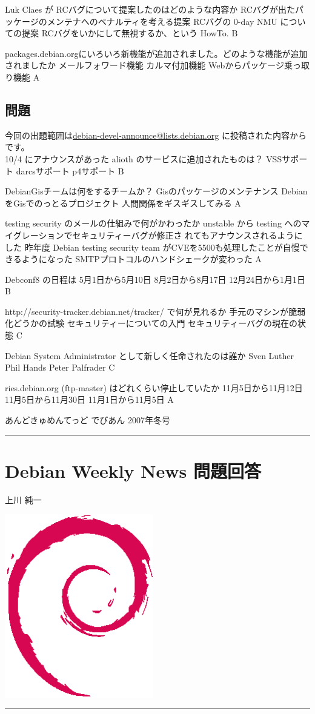 \documentclass[mingoth,a4paper]{jsarticle}
\renewcommand{\dancersection}[2]{%
\newpage
あんどきゅめんてっど でびあん 2007年冬号
%
\vspace{0.1mm}\\
{\color{dancerlightblue}\rule{\hsize}{2mm}}

%
%
\begin{minipage}[t]{0.7\hsize}
\color{dancerdarkblue}
\vspace{1cm}
\section{#1}
\hfill{}#2\\
\end{minipage}
\begin{minipage}[t]{0.3\hsize}
\vspace{-2cm}
\hfill{}\includegraphics[height=8cm]{image200502/openlogo-nd.eps}\\
\vspace{-5cm}
\end{minipage}
%
%
{\color{dancerdarkblue}\rule{0.74\hsize}{2mm}}
%
\vspace{2cm}
}
\begin{document}
\santaku
{Luk Claes が RCバグについて提案したのはどのような内容か}
{RCバグが出たパッケージのメンテナへのペナルティを考える提案}
{RCバグの 0-day NMU についての提案}
{RCバグをいかにして無視するか、という HowTo.}
{B}

\santaku
{packages.debian.orgにいろいろ新機能が追加されました。どのような機能が追加されましたか}
{メールフォワード機能}
{カルマ付加機能}
{Webからパッケージ乗っ取り機能}
{A}


\subsection{問題}
今回の出題範囲は\url{debian-devel-announce@lists.debian.org} に投稿された内容からです。\\

 \santaku
 {10/4 にアナウンスがあった alioth のサービスに追加されたものは？}
 {VSSサポート}
 {darcsサポート}
 {p4サポート}
 {B}

 \santaku
 {DebianGisチームは何をするチームか？}
 {Gisのパッケージのメンテナンス}
 {DebianをGisでのっとるプロジェクト}
 {人間関係をギスギスしてみる}
 {A}

 \santaku
 {testing security のメールの仕組みで何がかわったか}
 {unstable から testing へのマイグレーションでセキュリティーバグが修正さ
 れてもアナウンスされるようにした}
 {昨年度 Debian testing security team がCVEを5500も処理したことが自慢できるようになった}
 {SMTPプロトコルのハンドシェークが変わった}
 {A}


 \santaku
 {Debconf8 の日程は}
 {5月1日から5月10日}
 {8月2日から8月17日}
 {12月24日から1月1日}
 {B}

 \santaku
 {http://security-tracker.debian.net/tracker/ で何が見れるか}
 {手元のマシンが脆弱化どうかの試験}
 {セキュリティーについての入門}
 {セキュリティーバグの現在の状態}
 {C}

 \santaku
 {Debian System Administrator として新しく任命されたのは誰か}
 {Sven Luther}
 {Phil Hands}
 {Peter Palfrader}
 {C}

 \santaku
 {ries.debian.org (ftp-master) はどれくらい停止していたか}
 {11月5日から11月12日}
 {11月5日から11月30日}
 {11月1日から11月5日}
 {A}

\dancersection{Debian Weekly News 問題回答}{上川 純一}
\end{document}
